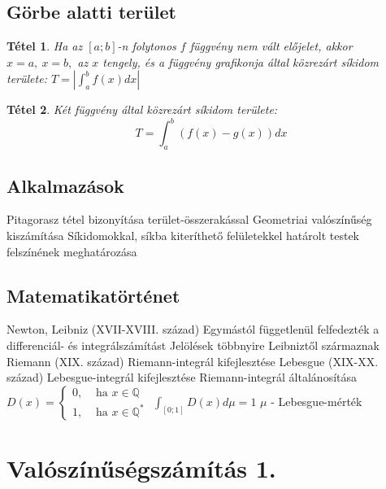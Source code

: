 \documentclass[twoside,12pt]{report}
\newtheorem{theorem}{Tétel}[section]
\theoremstyle{definition}
\begin{document}
\section{Görbe alatti terület}
	\begin{theorem}
		Ha az $[a;b]$-n folytonos $f$ függvény nem vált előjelet, akkor $x=a,\ x=b,$ az $x$ tengely, és a függvény grafikonja által közrezárt síkidom területe: $T=\left|\int_{a}^{b}f(x)dx\right|$
	\end{theorem}
	\begin{theorem}
		Két függvény által közrezárt síkidom területe:
		\begin{equation*}
			T=\int_{a}^{b}(f(x)-g(x))dx\tag{ha $f(x)>g(x)$}
		\end{equation*}
	\end{theorem}
\section{Alkalmazások}
	\begin{outline}
		\1 Pitagorasz tétel bizonyítása terület-összerakással
		\1 Geometriai valószínűség kiszámítása
		\1 Síkidomokkal, síkba kiteríthető felületekkel határolt testek felszínének meghatározása
	\end{outline}
\section{Matematikatörténet}
	\begin{outline}
		\1 Newton, Leibniz (XVII-XVIII. század)
			\2 Egymástól függetlenül felfedezték a differenciál- és integrálszámítást
			\2 Jelölések többnyire Leibniztől származnak
	 	\1 Riemann (XIX. század)
	 		\2 Riemann-integrál kifejlesztése
 		\1 Lebesgue (XIX-XX. század)
 			\2 Lebesgue-integrál kifejlesztése
 			\2 Riemann-integrál általánosítása
 			\2 $D(x)=\begin{cases}
	 			0, & \text{ ha } x\in\mathbb{Q}\\
	 			1, & \text{ ha } x\in\mathbb{Q}^*
 			\end{cases}$
		 	\2 $\int_{[0;1]} D(x)d\mu=1$
		 		\3 $\mu$ - Lebesgue-mérték
	\end{outline}
\chapter{Valószínűségszámítás 1.}
\end{document}
